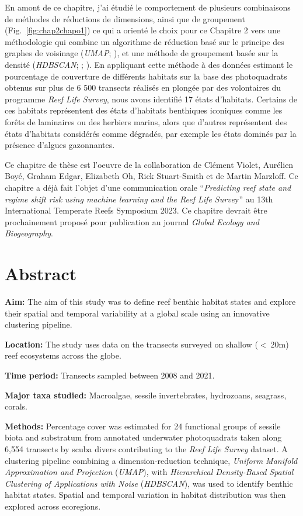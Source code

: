 \begin{refsection}
En amont de ce chapitre, j'ai étudié le comportement de plusieurs
combinaisons de méthodes de réductions de dimensions, ainsi que de
groupement (Fig.~\ref{fig:chap2chapo1}) ce qui a orienté le choix pour
ce Chapitre 2 vers une méthodologie qui combine un algorithme de
réduction basé sur le principe des graphes de voisinage (\emph{UMAP};
\textcite{McInnes_2020}), et une méthode de groupement basée sur la
densité (\emph{HDBSCAN}; \textcite{Moulavi_2014} ;
\textcite{McInnes2017}). En appliquant cette méthode à des données
estimant le pourcentage de couverture de différents habitats sur la base
des photoquadrats obtenus sur plus de 6 500 transects réalisés en
plongée par des volontaires du programme \emph{Reef Life Survey}, nous
avons identifié 17 états d'habitats. Certains de ces habitats
représentent des états d'habitats benthiques iconiques comme les forêts
de laminaires ou des herbiers marins, alors que d'autres représentent
des états d'habitats considérés comme dégradés, par exemple les états
dominés par la présence d'algues gazonnantes.

Ce chapitre de thèse est l'oeuvre de la collaboration de Clément Violet, Aurélien Boyé, Graham Edgar, Elizabeth Oh, Rick Stuart-Smith et de Martin Marzloff. Ce chapitre a déjà fait l'objet d'une communication orale
``\emph{Predicting reef state and regime shift risk using machine
learning and the Reef Life Surve}y'' au 13th International Temperate
Reefs Symposium 2023. Ce chapitre devrait être prochainement proposé
pour publication au journal \emph{Global Ecology and Biogeography}.

\clearpage

\hypertarget{abstract-chapt2}{%
\section{Abstract}\label{abstract-chapt2}}

\textbf{Aim:} The aim of this study was to define reef benthic habitat
states and explore their spatial and temporal variability at a global
scale using an innovative clustering pipeline.

\textbf{Location:} The study uses data on the transects surveyed on
shallow (\(<~20\)m) reef ecosystems across the globe.

\textbf{Time period:} Transects sampled between 2008 and 2021.

\textbf{Major taxa studied:} Macroalgae, sessile invertebrates,
hydrozoans, seagrass, corals.

\textbf{Methods:} Percentage cover was estimated for 24 functional
groups of sessile biota and substratum from annotated underwater
photoquadrats taken along 6,554 transects by scuba divers contributing
to the \emph{Reef Life Survey} dataset. A clustering pipeline combining
a dimension-reduction technique, \emph{Uniform Manifold Approximation
and Projection} (\emph{UMAP}), with \emph{Hierarchical Density-Based
Spatial Clustering of Applications with Noise} (\emph{HDBSCAN}), was
used to identify benthic habitat states. Spatial and temporal variation
in habitat distribution was then explored across ecoregions.


\end{refsection}

